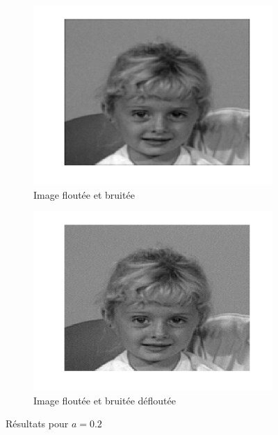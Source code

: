 \begin{figure}
\begin{subfigure}[b]{0.45\textwidth}
    \includegraphics[width=\textwidth]{Q2/noise_20.png}
    \caption{Image floutée et bruitée}
    \label{fig:a2noise}
  \end{subfigure}%
  \begin{subfigure}[b]{0.45\textwidth}
    \includegraphics[width=\textwidth]{Q2/unblurred_20.png}
    \caption{Image floutée et bruitée défloutée}
    \label{fig:a2unblurred}
  \end{subfigure}
  \caption{Résultats pour $a = 0.2$}\label{fig:a2}
\end{figure}

